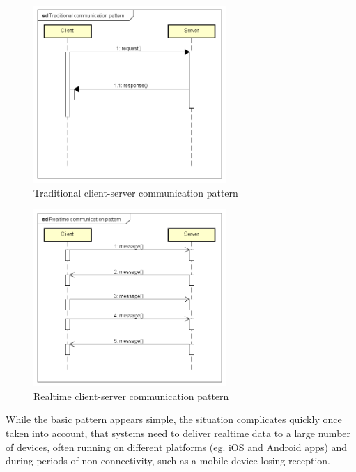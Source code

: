 \begin{figure}[H]
	\centering
	\includegraphics[width=0.65\textwidth]{figures/02_analysis/Traditional-communication-pattern}
    \caption{Traditional client-server communication pattern}
    \label{fig:traditional-communication}
\end{figure}

\begin{figure}[H]
	\centering
	\includegraphics[width=0.65\textwidth]{figures/02_analysis/Realtime-communication-pattern}
    \caption{Realtime client-server communication pattern}
    \label{fig:realtime-communication-pattern}
\end{figure}

While the basic pattern appears simple, the situation complicates quickly once taken into account, that systems need to deliver realtime data to a large number of devices, often running on different platforms (eg. iOS and Android apps) and during periods of non-connectivity, such as a mobile device losing reception. 

